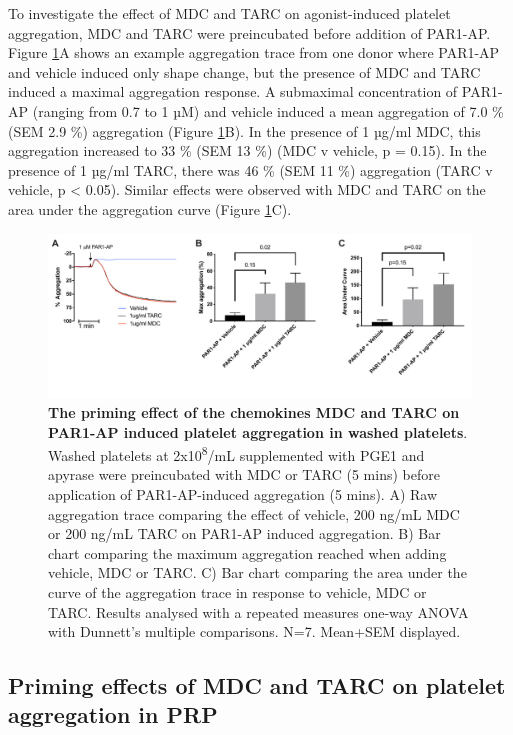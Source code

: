 \documentclass[11pt,twoside]{bristolthesis}
\begin{document}
To investigate the effect of MDC and TARC on agonist-induced platelet aggregation, MDC and TARC were preincubated before addition of PAR1-AP. Figure \ref{fig:MDC-TARC-agg}A shows an example aggregation trace from one donor where PAR1-AP and vehicle induced only shape change, but the presence of MDC and TARC induced a maximal aggregation response. A submaximal concentration of PAR1-AP (ranging from 0.7 to 1 µM) and vehicle induced a mean aggregation of 7.0 \% (SEM 2.9 \%) aggregation (Figure \ref{fig:MDC-TARC-agg}B). In the presence of 1 µg/ml MDC, this aggregation increased to 33 \% (SEM 13 \%) (MDC v vehicle, p = 0.15). In the presence of 1 µg/ml TARC, there was 46 \% (SEM 11 \%) aggregation (TARC v vehicle, p \textless{} 0.05). Similar effects were observed with MDC and TARC on the area under the aggregation curve (Figure \ref{fig:MDC-TARC-agg}C).



\begin{figure}
\includegraphics[width=0.85\linewidth]{figure/Chemokines/Layouts/MDC_TARC_aggregation_PAR1} \caption[The priming effect of the chemokines MDC and TARC on PAR1-AP induced platelet aggregation in washed platelets]{\textbf{The priming effect of the chemokines MDC and TARC on PAR1-AP induced platelet aggregation in washed platelets}. Washed platelets at 2x10\textsuperscript{8}/mL supplemented with PGE1 and apyrase were preincubated with MDC or TARC (5 mins) before application of PAR1-AP-induced aggregation (5 mins). A) Raw aggregation trace comparing the effect of vehicle, 200 ng/mL MDC or 200 ng/mL TARC on PAR1-AP induced aggregation. B) Bar chart comparing the maximum aggregation reached when adding vehicle, MDC or TARC. C) Bar chart comparing the area under the curve of the aggregation trace in response to vehicle, MDC or TARC. Results analysed with a repeated measures one-way ANOVA with Dunnett's multiple comparisons. N=7. Mean+SEM displayed.}\label{fig:MDC-TARC-agg}
\end{figure}
\hypertarget{priming-effects-of-mdc-and-tarc-on-platelet-aggregation-in-prp}{%
\subsection{Priming effects of MDC and TARC on platelet aggregation in PRP}\label{priming-effects-of-mdc-and-tarc-on-platelet-aggregation-in-prp}}
\end{document}
